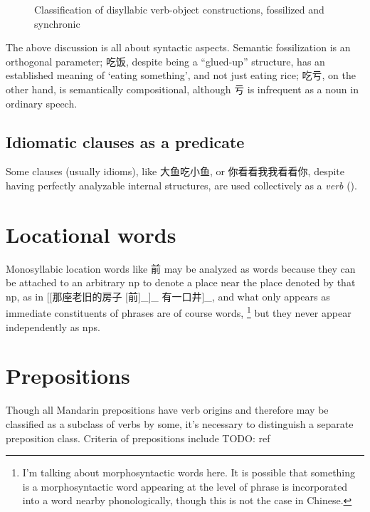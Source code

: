 \documentclass[UTF8, a4paper, oneside, scheme=plain, 12pt]{ctexrep}
\newcommand{\translate}[1]{`#1'}
\begin{document}
\begin{figure}[H]
    \centering
    \caption{Classification of disyllabic verb-object constructions, 
    \label{fig:verb-object-classification}
    fossilized and synchronic}
    {\small }
\end{figure}

The above discussion is all about syntactic aspects. 
Semantic fossilization is an orthogonal parameter; 
吃饭, despite being a ``glued-up'' structure, 
has an established meaning of \translate{eating something}, 
and not just eating rice; 
吃亏, on the other hand, is semantically compositional, 
although 亏 is infrequent as a noun in ordinary speech. 

\subsection{Idiomatic clauses as a predicate}

Some clauses (usually idioms), like 大鱼吃小鱼, or 你看看我我看看你,
despite having perfectly analyzable internal structures, 
are used collectively as a \emph{verb} ().

\section{Locational words}\label{sec:pos.locational}

Monosyllabic location words like 前 may be analyzed as words 
because they can be attached to an arbitrary \ac{np} 
to denote a place near the place denoted by that \ac{np},
as in [[那座老旧的房子 [前]_{}]_{} 有一口井]_{},
and what only appears as immediate constituents of phrases are of course words,%
\footnote{
    I'm talking about morphosyntactic words here.
    It is possible that something is a morphosyntactic word 
    appearing at the level of phrase
    is incorporated into a word nearby phonologically,
    though this is not the case in Chinese.
}%
but they never appear independently as \ac{np}s.


\section{Prepositions}\label{sec:preposition-pos}

Though all Mandarin prepositions have verb origins 
and therefore may be classified as a subclass of verbs by some,
it's necessary to distinguish a separate preposition class.
Criteria of prepositions include TODO: ref
\end{document}
